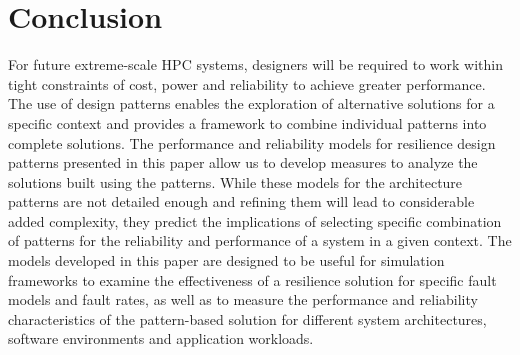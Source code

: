 \section{Conclusion}
\label{sec:Conclusion}

For future extreme-scale HPC systems, designers will be required to work within tight constraints of cost, power and reliability to achieve greater performance. The use of design patterns enables the exploration of alternative solutions for a specific context and provides a framework to combine individual patterns into complete solutions.  
The performance and reliability models for resilience design patterns presented in this paper allow us to develop measures to analyze the solutions built using the patterns. 
While these models for the architecture patterns are not detailed enough and refining them will lead to considerable added complexity, they predict the implications of selecting specific combination of patterns for the reliability and performance of a system in a given context.   
The models developed in this paper are designed to be useful for simulation frameworks to examine the effectiveness of a resilience solution for specific fault models and fault rates, as well as to measure the performance and reliability characteristics of the pattern-based solution for different system architectures, software environments and application workloads.   


